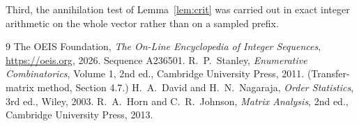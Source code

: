 \documentclass[11pt,a4paper]{article}
\theoremstyle{plain}
\theoremstyle{definition}
\begin{document}
Third, the annihilation test of Lemma~\ref{lem:crit} was carried out in exact integer
arithmetic on the whole vector rather than on a sampled prefix.

\begin{thebibliography}{9}
 The OEIS Foundation, \emph{The On-Line Encyclopedia of Integer
Sequences}, \url{https://oeis.org}, 2026. Sequence A236501.
 R.~P.~Stanley, \emph{Enumerative Combinatorics}, Volume 1, 2nd ed.,
Cambridge University Press, 2011. (Transfer-matrix method, Section 4.7.)
 H.~A.~David and H.~N.~Nagaraja, \emph{Order Statistics}, 3rd ed., Wiley,
2003.
 R.~A.~Horn and C.~R.~Johnson, \emph{Matrix Analysis}, 2nd ed., Cambridge
University Press, 2013.
\end{thebibliography}
\end{document}
